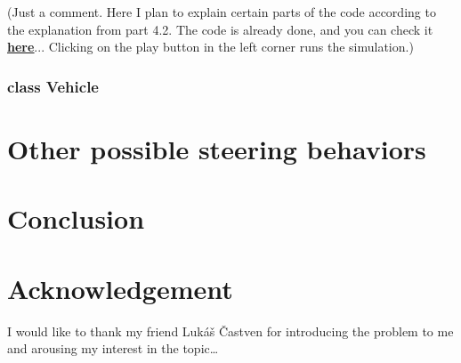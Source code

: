\documentclass[10pt,twoside,english,a4paper]{article}
\begin{document}
(Just a comment. Here I plan to explain certain parts of the code according to the explanation from part 4.2. The code is already done, and you can check it \textbf{\underline{\href{https://editor.p5js.org/RichardCernansky/sketches/E0zAXshWw}{here}}}... Clicking on the play button in the left corner runs the simulation.)

\subsubsection{class Vehicle} \label{class vehicle} 

\section{Other possible steering behaviors} \label{other} 

\section{Conclusion} \label{coclusion} 

\section*{Acknowledgement}
I would like to thank my friend Lukáš Častven for introducing the problem to me and arousing my interest in the topic\ldots


 
\end{document}
